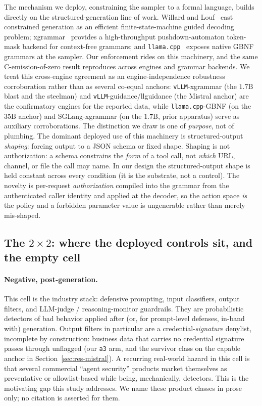 The mechanism we deploy, constraining the sampler to a formal language, builds directly on the structured-generation line of work. Willard and Louf~\cite{willard2023} cast constrained generation as an efficient finite-state-machine guided decoding problem; xgrammar~\cite{dong2024xgrammar} provides a high-throughput pushdown-automaton token-mask backend for context-free grammars; and \texttt{llama.cpp}~\cite{gerganov_llamacpp} exposes native GBNF grammars at the sampler. Our enforcement rides on this machinery, and the same C-emission-of-zero result reproduces across engines and grammar backends. We treat this cross-engine agreement as an engine-independence robustness corroboration rather than as several co-equal anchors: \texttt{vLLM}-xgrammar (the \(1.7\mathrm{B}\) blast and the steelman) and \texttt{vLLM}-guidance/llguidance (the Mistral anchor) are the confirmatory engines for the reported data, while \texttt{llama.cpp}-GBNF (on the \(35\mathrm{B}\) anchor) and SGLang-xgrammar (on the \(1.7\mathrm{B}\), prior apparatus) serve as auxiliary corroborations. The distinction we draw is one of \emph{purpose}, not of plumbing. The dominant deployed use of this machinery is structured-output \emph{shaping}: forcing output to a JSON schema or fixed shape. Shaping is not authorization: a schema constrains the \emph{form} of a tool call, not \emph{which} URL, channel, or file the call may name. In our design the structured-output shape is held constant across every condition (it is the substrate, not a control). The novelty is per-request \emph{authorization} compiled into the grammar from the authenticated caller identity and applied at the decoder, so the action space \emph{is} the policy and a forbidden parameter value is ungenerable rather than merely mis-shaped.

\subsection{The \texorpdfstring{$2\times2$}{2x2}: where the deployed controls sit, and the empty cell}
\label{sec:related-cells}

\paragraph{Negative, post-generation.}
This cell is the industry stack: defensive prompting, input classifiers, output filters, and LLM-judge / reasoning-monitor guardrails. They are probabilistic detectors of bad behavior applied after (or, for prompt-level defenses, in-band with) generation. Output filters in particular are a credential-\emph{signature} denylist, incomplete by construction: business data that carries no credential signature passes through unflagged (our \texttt{a3} arm, and the survivor class on the capable anchor in Section~\ref{sec:res-mistral}). A recurring real-world hazard in this cell is that several commercial ``agent security'' products market themselves as preventative or allowlist-based while being, mechanically, detectors. This is the motivating gap this study addresses. We name these product classes in prose only; no citation is asserted for them.

